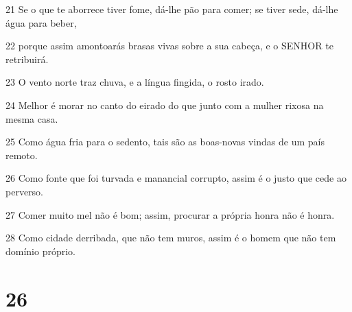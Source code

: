 \par 21 Se o que te aborrece tiver fome, dá-lhe pão para comer; se tiver sede, dá-lhe água para beber,
\par 22 porque assim amontoarás brasas vivas sobre a sua cabeça, e o SENHOR te retribuirá.
\par 23 O vento norte traz chuva, e a língua fingida, o rosto irado.
\par 24 Melhor é morar no canto do eirado do que junto com a mulher rixosa na mesma casa.
\par 25 Como água fria para o sedento, tais são as boas-novas vindas de um país remoto.
\par 26 Como fonte que foi turvada e manancial corrupto, assim é o justo que cede ao perverso.
\par 27 Comer muito mel não é bom; assim, procurar a própria honra não é honra.
\par 28 Como cidade derribada, que não tem muros, assim é o homem que não tem domínio próprio.

\chapter{26}

